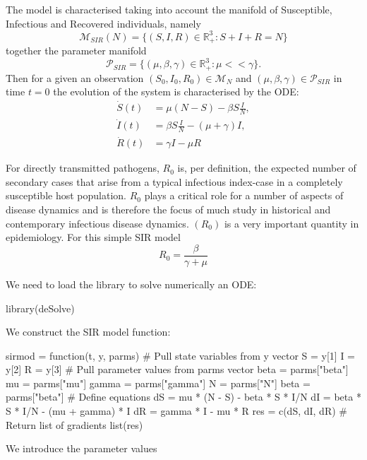 \documentclass[12pt]{article}\usepackage[]{graphicx}\usepackage[]{color}
\begin{document}
The model is characterised taking into account the manifold of Susceptible, Infectious and Recovered individuals, namely
$$
\mathcal{M}_{SIR}(N) = \{(S,I,R) \in \mathbb{R}_+^3 : S+I+R = N\}
$$
together the parameter manifold
$$
\mathcal{P}_{SIR} = \{(\mu,\beta,\gamma) \in \mathbb{R}_+^3: \mu << \gamma\}.
$$
Then for a given an observation $(S_0,I_0,R_0) \in \mathcal{M}_N$ and $(\mu,\beta,\gamma) \in \mathcal{P}_{SIR}$ in time $t=0$ the
evolution of the system is characterised by the ODE:
\begin{align}
\dot{S}(t) & = \mu(N-S)-\beta S \frac{I}{N}, \label{SIR1}\\
\dot{I}(t) & = \beta S \frac{I}{N} - (\mu + \gamma)I, \label{SIR2}\\
\dot{R}(t) & = \gamma I - \mu R \label{SIR3}
\end{align}

For directly transmitted pathogens, $R_0$ is, per definition, the expected number of secondary cases that arise from a typical infectious index-case in a completely susceptible host population. $R_0$ plays a critical role for a number of aspects of disease dynamics and is therefore the focus of much study in historical and contemporary infectious disease dynamics. $(R_0)$ is a very important quantity in epidemiology. For this simple SIR model $$R_0 = \frac{\beta}{\gamma + \mu}$$

We need to load the library to solve numerically an ODE:

\begin{Schunk}
\begin{Sinput}
library(deSolve)
\end{Sinput}
\end{Schunk}

We construct the SIR model function:

\begin{Schunk}
\begin{Sinput}
sirmod = function(t, y, parms) {
  # Pull state variables from y vector
  S = y[1]
  I = y[2]
  R = y[3]
  # Pull parameter values from parms vector beta = parms["beta"]
  mu = parms["mu"]
  gamma = parms["gamma"]
  N = parms["N"]
  beta = parms["beta"]
  # Define equations
  dS = mu * (N - S) - beta * S * I/N
  dI = beta * S * I/N - (mu + gamma) * I 
  dR = gamma * I - mu * R
  res = c(dS, dI, dR)
  # Return list of gradients
  list(res)
}
\end{Sinput}
\end{Schunk}

We introduce the parameter values
\end{document}
